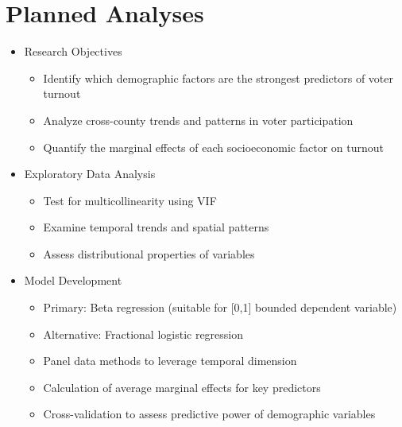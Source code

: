 \documentclass[11pt]{article}
\begin{document}
\section*{Planned Analyses}
\begin{itemize}\setlength{\itemsep}{0pt}
    \item Research Objectives
          \begin{itemize}\setlength{\itemsep}{0pt}
              \item Identify which demographic factors are the strongest predictors of voter turnout
              \item Analyze cross-county trends and patterns in voter participation
              \item Quantify the marginal effects of each socioeconomic factor on turnout
          \end{itemize}
    \item Exploratory Data Analysis
          \begin{itemize}\setlength{\itemsep}{0pt}
              \item Test for multicollinearity using VIF
              \item Examine temporal trends and spatial patterns
              \item Assess distributional properties of variables
          \end{itemize}
    \item Model Development
          \begin{itemize}\setlength{\itemsep}{0pt}
              \item Primary: Beta regression (suitable for [0,1] bounded dependent variable)
              \item Alternative: Fractional logistic regression
              \item Panel data methods to leverage temporal dimension
              \item Calculation of average marginal effects for key predictors
              \item Cross-validation to assess predictive power of demographic variables
          \end{itemize}
\end{itemize}
\end{document}
